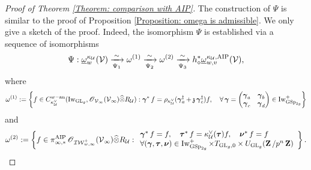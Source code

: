 \begin{proof}[Proof of Theorem \ref{Theorem: comparison with AIP}]
The construction of $\Psi$ is similar to the proof of Proposition \ref{Proposition: omega is admissible}. We only give a sketch of the proof. Indeed, the isomorphism $\Psi$ is established via a sequence of isomorphisms 
$$ \Psi: \underline{\omega}_{w}^{\kappa_{\calU}}(\calV) \xrightarrow[\Psi_1]{\sim} \omega^{(1)} \xrightarrow[\Psi_2]{\sim} \omega^{(2)}\xrightarrow[\Psi_3]{\sim} h_{\diamond}^*\underline{\omega}_{w, v}^{\kappa_{\calU}, \AIP}(\calV),
$$
where 
$$
\omega^{(1)} := \left\{ f\in C_{\kappa_{\calU}^{\vee}}^{w-\an}(\Iw_{\GL_g}, \scrO_{\calV_{\infty}}(\calV_{\infty})\widehat{\otimes}R_{\calU}): \bfgamma^* f = \rho_{\kappa_{\calU}^{\vee}}(\bfgamma_a^{\ddagger} + \frakz \bfgamma_c^{\ddagger}) f, \quad \forall \bfgamma = \begin{pmatrix} \bfgamma_a & \bfgamma_b \\ \bfgamma_c & \bfgamma_d\end{pmatrix} \in \Iw_{\GSp_{2g}}^+\right\}
$$
and
$$
\omega^{(2)} := \left\{f\in \pi^{\AIP}_{\infty, *}\scrO_{\adicIW_{w, \infty}^+}(\calV_{\infty})\widehat{\otimes}R_{\calU}: \begin{array}{l}
        \bfgamma^* f = f, \quad \bftau^*f = \kappa_{\calU}^{\vee}(\bftau)f, \quad \bfnu^* f = f  \\
        \forall (\bfgamma, \bftau, \bfnu)\in \Iw_{\GSp_{2g}}^+\times T_{\GL_g, 0}\times U_{\GL_g}(\Z/p^n\Z) 
    \end{array}\right\}.
$$


\end{proof}
